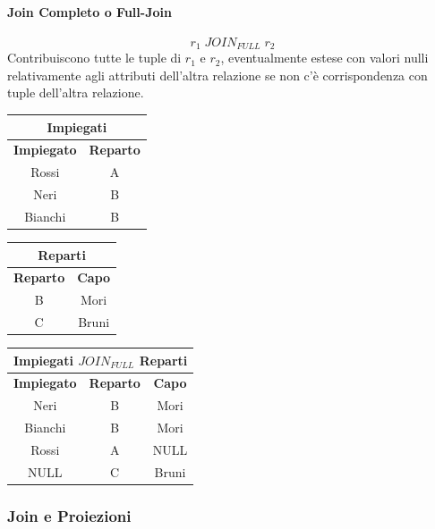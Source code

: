 \documentclass[../main.tex]{subfiles}
\begin{document}
	\paragraph{Join Completo o Full-Join}
	\[r_1 \; JOIN_{FULL} \; r_2\]
	Contribuiscono tutte le tuple di $r_1$ e $r_2$, eventualmente estese con valori nulli relativamente agli attributi dell’altra relazione se non c’è corrispondenza con tuple dell’altra relazione.
	\begin{center}
		\begin{tabular}{ |c|c| }
			\hline
			\multicolumn{2}{|c|}{Impiegati}\\
			\hline
			\textbf{Impiegato} & \textbf{Reparto}\\
			\hline
			Rossi & A\\
			Neri & B\\
			Bianchi & B\\
			\hline
		\end{tabular}
		\begin{tabular}{ |c|c| }
			\hline
			\multicolumn{2}{|c|}{Reparti}\\
			\hline
			\textbf{Reparto} & \textbf{Capo}\\
			\hline
			B & Mori \\
			C & Bruni \\
			\hline
		\end{tabular}
	\end{center}
	\begin{center}
		\begin{tabular}{ |c|c|c| }
			\hline
			\multicolumn{3}{|c|}{Impiegati $JOIN_{FULL}$ Reparti}\\
			\hline
			\textbf{Impiegato} & \textbf{Reparto} & \textbf{Capo}\\
			\hline
			Neri & B & Mori\\
			Bianchi & B & Mori\\
			Rossi & A & NULL\\
			NULL & C & Bruni\\
			\hline
		\end{tabular}
	\end{center}
	\subsubsection{Join e Proiezioni}
\end{document}
